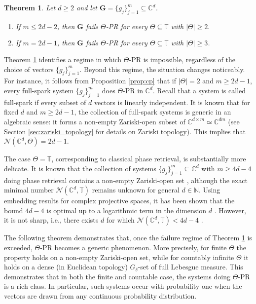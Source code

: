 \documentclass[reqno,a4paper,11pt]{amsart}
\numberwithin{equation}{section}
\newtheorem{theorem}[definition]{Theorem}
\def\N{{\mathbb N}}
\def\T{{\mathbb T}}
\def\C{{\mathbb C}}
\newcommand\1{\mathds{1}}
\begin{document}
\begin{theorem}\label{thm:failure}
    Let $d \geq 2$ and let $\mathbf{G} = \{ g_j \}_{j=1}^m \subseteq \C^d$. 
    \begin{enumerate}
        \item If $m \leq 2d-2$, then $\mathbf{G}$ fails $\Theta$-PR for every $\Theta \subseteq \T$ with $|\Theta| \geq 2.$
        \item If $m=2d-1$, then $\mathbf{G}$ fails $\Theta$-PR for every $\Theta \subseteq \T$ with $|\Theta| \geq 3$.
    \end{enumerate}
\end{theorem}

Theorem \ref{thm:failure} identifies a regime in which $\Theta$-PR is impossible, regardless of the choice of vectors $\{ g_j \}_{j=1}^m$. Beyond this regime, the situation changes noticeably. For instance, it follows from Proposition \ref{prop:cp} that if $|\Theta|=2$ and $m \geq 2d-1$, every full-spark system $\{ g_j \}_{j=1}^m$ does $\Theta$-PR in $\C^d$. Recall that a system is called full-spark if every subset of $d$ vectors is linearly independent. It is known that for fixed $d$ and $m \geq 2d-1$, the collection of full-spark systems is generic in an algebraic sense: it forms a non-empty Zariski-open subset of $\C^{d \times m} \simeq \C^{dm}$ \cite{alexeev2012full} (see Section \ref{sec:zariski_topology} for details on Zariski topology). This implies that $\mathcal{N}(\C^d,\Theta) = 2d-1$. 

The case $\Theta = \T$, corresponding to classical phase retrieval, is substantially more delicate. It is known that the collection of systems $\{ g_j \}_{j=1}^m \subseteq \C^d$ with $m \geq 4d-4$ doing phase retrieval contains a non-empty Zariski-open set \cite{conca2015algebraic}, although the exact minimal number $\mathcal{N}(\C^d,\T)$ remains unknown for general $d \in \N$. Using embedding results for complex projective spaces, it has been shown that the bound $4d-4$ is optimal up to a logarithmic term in the dimension $d$ \cite{heinosaari2013quantum}. However, it is not sharp, i.e., there exists $d$ for which $\mathcal{N}(\C^d,\T) < 4d-4$ \cite{vinzant2015small}.

The following theorem demonstrates that, once the failure regime of Theorem \ref{thm:failure} is exceeded, $\Theta$-PR becomes a generic phenomenon. More precisely, for finite $\Theta$ the property holds on a non-empty Zariski-open set, while for countably infinite $\Theta$ it holds on a dense (in Euclidean topology) $G_\delta$-set of full Lebesgue measure. This demonstrates that in both the finite and countable case, the systems doing $\Theta$-PR is a rich class. In particular, such systems occur with probability one when the vectors are drawn from any continuous probability distribution.
\end{document}
